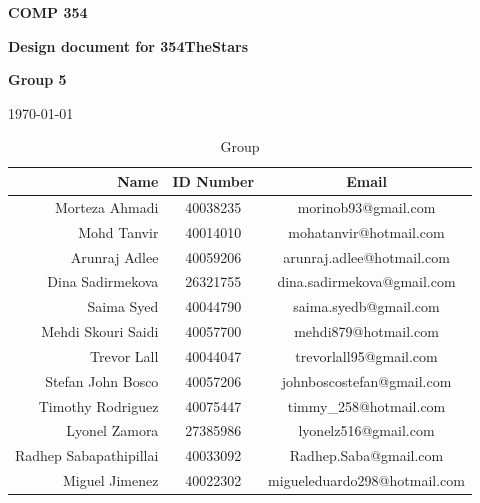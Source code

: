 \documentclass[11pt]{article}
\begin{document}
                \vspace*{0.5in}
                \centerline{\bf\Large COMP 354}
                \centerline{\bf\Large Design document for 354TheStars}

                \vspace*{0.5in}
                \centerline{\bf\Large Group 5}

                \vspace*{0.5in}
                \centerline{\today}

                \begin{table}[htbp]
                    \caption{Group}
                    \begin{center}
                        \begin{tabular}{|r | c| c |}
                            \hline
                            Name & ID Number & Email \\
                            \hline
                            Morteza Ahmadi & 40038235 & morinob93@gmail.com \\
                            \hline
                            Mohd Tanvir & 40014010 & mohatanvir@hotmail.com \\
                            \hline
                            Arunraj Adlee & 40059206 & arunraj.adlee@hotmail.com \\
                            \hline
                            Dina Sadirmekova & 26321755 & dina.sadirmekova@gmail.com \\
                            \hline
                            Saima Syed & 40044790 & saima.syedb@gmail.com \\
                            \hline
                            Mehdi Skouri Saidi & 40057700 & mehdi879@hotmail.com \\
                            \hline
                            Trevor Lall & 40044047 & trevorlall95@gmail.com \\
                            \hline
                            Stefan John Bosco & 40057206 & johnboscostefan@gmail.com \\
                            \hline
                            Timothy Rodriguez & 40075447 & timmy\_258@hotmail.com \\
                            \hline
                            Lyonel Zamora & 27385986 & lyonelz516@gmail.com \\
                            \hline
                            Radhep Sabapathipillai & 40033092 & Radhep.Saba@gmail.com \\
                            \hline
                            Miguel Jimenez & 40022302 & migueleduardo298@hotmail.com\\
                            \hline
                        \end{tabular}
                    \end{center}
                \end{table}
\end{document}
